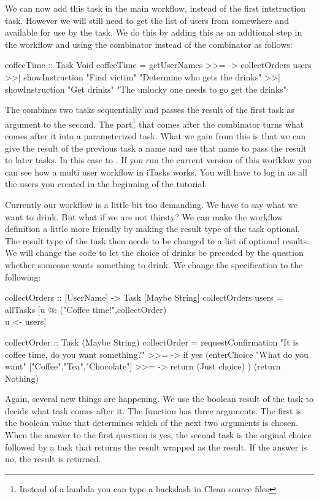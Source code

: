 \documentclass[a4paper,11pt]{article}
\begin{document}
We can now add this task in the main workflow, instead of the first intstruction task. However we will still need to get the list of users from somewhere and available for use by the  task. We do this by adding this as an addtional step in the workflow and using the \CleanInline{>>=} combinator instead of the \CleanInline{>>|} combinator as follows:
\begin{CleanCode}
coffeeTime :: Task Void
coffeeTime
  =   getUserNames
  >>= \users ->
      collectOrders users
  >>| showInstruction "Find victim" "Determine who gets the drinks"
  >>| showInstruction "Get drinks" "The unlucky one needs to go get the drinks"
\end{CleanCode}
The \CleanInline{>>=} combines two tasks sequentially and passes the result of the first task as argument to the second. The \CleanInline{\\users ->} part\footnote{Instead of a lambda you can type a backslash in Clean source files} that comes after the \CleanInline{>>=} combinator turns what comes after it into a parameterized task. What we gain from this is that we can give the result of the previous task a name and use that name to pass the result to later tasks. In this case to . If you run the current version of this worfklow you can see how a multi user workflow in iTasks works. You will have to log in as all the users you created in the beginning of the tutorial.

Currently our workflow is a little bit too demanding. We have to say what we want to drink. But what if we are not thirsty? We can make the workflow definition a little more friendly by making the result type of the  task optional. The result type of the  task then needs to be changed to a list of optional results. We will change the code to let the choice of drinks be preceded by the question whether someone wants something to drink. We change the specification to the following:
\begin{CleanCode}
collectOrders :: [UserName] -> Task [Maybe String] 
collectOrders users = allTasks [u @: ("Coffee time!",collectOrder) \\ u <- users]

collectOrder :: Task (Maybe String)
collectOrder
    =   requestConfirmation "It is coffee time, do you want something?"
    >>= \yes -> if yes
        (enterChoice "What do you want" ["Coffee","Tea","Chocolate"]
         >>= \choice -> return (Just choice)
        )
        (return Nothing)
\end{CleanCode}
Again, several new things are happening. We use the boolean result of the  task to decide what task comes after it.
The  function has three arguments. The first is the boolean value that determines which of the next two arguments is chosen. When the answer to the first question is yes, the second task is the orginal choice followed by a task that returns the result wrapped as  the result. If the answer is no, the result  is returned.
\end{document}
